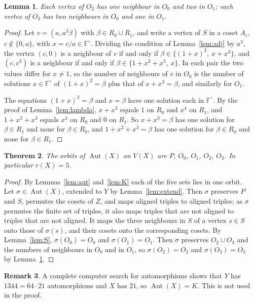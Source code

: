 \documentclass[preprint,12pt]{elsarticle}
\newtheorem{theorem}{Theorem}[section]
\newtheorem{lemma}[theorem]{Lemma}
\theoremstyle{definition}
\newtheorem{remark}[theorem]{Remark}
\newcommand{\F}{\mathbb{F}}
\newcommand{\Aut}{\operatorname{Aut}}
\begin{document}
\begin{lemma}\label{lem:O23}
Each vertex of $O_2$ has one neighbour in $O_0$ and two in $O_1$; each vertex of $O_3$ has two neighbours in $O_0$ and one in $O_1$.
\end{lemma}

\begin{proof}
Let $v=(a,a^3\beta)$ with $\beta\in R_0\cup R_1$, and write a vertex of $S$ in a coset $A_c$, $c\notin\{0,a\}$, with $x=c/a\in\F^\circ$. Dividing the condition of Lemma~\ref{lem:adj} by $a^3$, the vertex $(c,0)$ is a neighbour of $v$ if and only if $\beta\in\{(1+x)^2,\ x+x^3\}$, and $(c,c^3)$ is a neighbour if and only if $\beta\in\{1+x^2+x^3,\ x\}$. In each pair the two values differ for $x\ne1$, so the number of neighbours of $v$ in $O_0$ is the number of solutions $x\in\F^\circ$ of $(1+x)^2=\beta$ plus that of $x+x^3=\beta$, and similarly for $O_1$.

The equations $(1+x)^2=\beta$ and $x=\beta$ have one solution each in $\F^\circ$. By the proof of Lemma~\ref{lem:lambda}, $x+x^3$ equals $1$ on $R_0$ and $x^4$ on $R_1$, and $1+x^2+x^3$ equals $x^4$ on $R_0$ and $0$ on $R_1$. So $x+x^3=\beta$ has one solution for $\beta\in R_1$ and none for $\beta\in R_0$, and $1+x^2+x^3=\beta$ has one solution for $\beta\in R_0$ and none for $\beta\in R_1$.
\end{proof}

\begin{theorem}\label{thm:orbits}
The orbits of $\Aut(X)$ on $V(X)$ are $P$, $O_0$, $O_1$, $O_2$, $O_3$. In particular $r(X)=5$.
\end{theorem}

\begin{proof}
By Lemmas~\ref{lem:aut} and~\ref{lem:K} each of the five sets lies in one orbit. Let $\sigma\in\Aut(X)$, extended to $Y$ by Lemma~\ref{lem:extend}. Then $\sigma$ preserves $P$ and $S$, permutes the cosets of $Z$, and maps aligned triples to aligned triples; as $\sigma$ permutes the finite set of triples, it also maps triples that are not aligned to triples that are not aligned. It maps the three neighbours in $S$ of a vertex $s\in S$ onto those of $\sigma(s)$, and their cosets onto the corresponding cosets. By Lemma~\ref{lem:S}, $\sigma(O_0)=O_0$ and $\sigma(O_1)=O_1$. Then $\sigma$ preserves $O_2\cup O_3$ and the numbers of neighbours in $O_0$ and in $O_1$, so $\sigma(O_2)=O_2$ and $\sigma(O_3)=O_3$ by Lemma~\ref{lem:O23}.
\end{proof}

\begin{remark}
A complete computer search for automorphisms shows that $Y$ has $1344=64\cdot21$ automorphisms and $X$ has $21$, so $\Aut(X)=K$. This is not used in the proof.
\end{remark}
\end{document}
